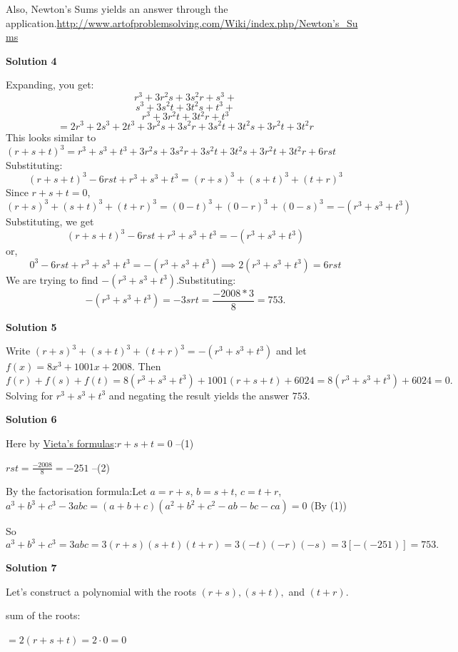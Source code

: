 \begin{enumerate}
 Also, Newton's Sums yields an answer through the application.\href{https://artofproblemsolving.comhttp://www.artofproblemsolving.com/Wiki/index.php/Newton's\_Sums}{http://www.artofproblemsolving.com/Wiki/index.php/Newton's\_Sums}

 



\textbf{Solution 4}

Expanding, you get:
 \[r^3 + 3r^2s + 3s^2r +s^3 +\] 
 \[s^3 + 3s^2t + 3t^2s +t^3 +\]
 \[r^3 + 3r^2t + 3t^2r +t^3\]
 \[= 2r^3 + 2s^3 + 2t^3 + 3r^2s + 3s^2r + 3s^2t + 3t^2s + 3r^2t + 3t^2r\]This looks similar to $(r+s+t)^3 = r^3 + s^3 + t^3 + 3r^2s + 3s^2r + 3s^2t + 3t^2s + 3r^2t + 3t^2r + 6rst$Substituting:
 \[(r+s+t)^3 - 6rst + r^3+s^3+t^3 = (r + s)^3 + (s + t)^3 + (t + r)^3\]Since $r+s+t = 0$, 
 \[(r+s)^3 + (s+t)^3 + (t+r)^3 = (0-t)^3 + (0-r)^3 + (0-s)^3 = -(r^3 + s^3 + t^3)\]Substituting, we get 
 \[(r+s+t)^3 - 6rst + r^3+s^3+t^3 =  -(r^3 + s^3 + t^3)\]or, 
 \[0^3 - 6rst + r^3+s^3+t^3 =  -(r^3 + s^3 + t^3) \implies 2(r^3 + s^3 + t^3) = 6rst\]We are trying to find $-(r^3 + s^3 + t^3)$.Substituting:
 \[-(r^3 + s^3 + t^3) = -3srt = \frac{-2008*3}{8} = \boxed{753}.\]




\textbf{Solution 5}

Write $(r+s)^3+(s+t)^3+(t+r)^3=-(r^3+s^3+t^3)$ and let $f(x)=8x^3+1001x+2008$. Then 
 \[f(r)+f(s)+f(t)=8(r^3+s^3+t^3)+1001(r+s+t)+6024=8(r^3+s^3+t^3)+6024=0.\] Solving for $r^3+s^3+t^3$ and negating the result yields the answer $\boxed{753}.$




\textbf{Solution 6}

Here by \href{https://artofproblemsolving.com/wiki/index.php?title=Vieta\%27s\_formulas}{Vieta's formulas}:$r+s+t = 0$ --(1)

 $rst = \frac{-2008}{8} = -251$ --(2)

 By the factorisation formula:Let $a = r+s$, $b = s+t$, $c = t+r$, $a^3+b^3+c^3-3abc = (a+b+c)(a^2+b^2+c^2-ab-bc-ca) = 0$ (By (1))

 So 
 \[a^3+b^3+c^3 = 3abc = 3(r+s)(s+t)(t+r) = 3(-t)(-r)(-s) = 3[-(-251)] = \boxed{753}.\]




\textbf{Solution 7}

Let's construct a polynomial with the roots $(r+s), (s+t),$ and $(t+r)$.

 sum of the roots:

 $=2(r+s+t)=2\cdot0=0$


\end{enumerate}
